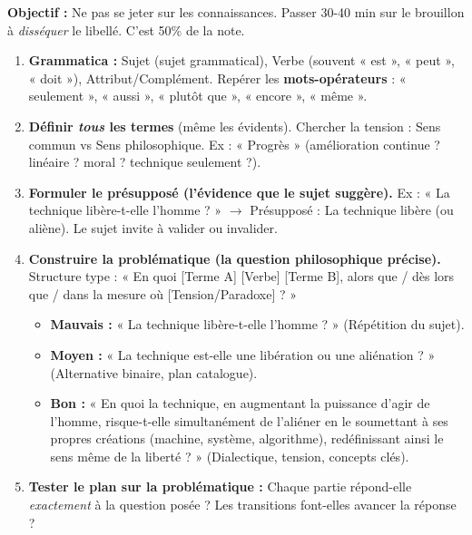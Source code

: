 \documentclass[11pt]{article}
\newcommand{\cle}[1]{{\popxbold\color{popdark}#1}}
\begin{document}
\begin{methode}
    \textbf{Objectif :} Ne pas se jeter sur les connaissances. Passer 30-40 min sur le brouillon à \emph{disséquer} le libellé. C'est 50\% de la note.
    \begin{enumerate}
        \item \textbf{Grammatica :} Sujet (sujet grammatical), Verbe (souvent « est », « peut », « doit »), Attribut/Complément. Repérer les \textbf{mots-opérateurs} : « seulement », « aussi », « plutôt que », « encore », « même ».
        \item \textbf{Définir \emph{tous} les termes} (même les évidents). Chercher la tension : Sens commun vs Sens philosophique. Ex : « Progrès » (amélioration continue ? linéaire ? moral ? technique seulement ?).
        \item \textbf{Formuler le \cle{présupposé} (l'évidence que le sujet suggère).} Ex : « La technique libère-t-elle l'homme ? » $\rightarrow$ Présupposé : La technique libère (ou aliène). Le sujet invite à valider ou invalider.
        \item \textbf{Construire la \cle{problématique} (la question philosophique précise).} Structure type : « En quoi [Terme A] [Verbe] [Terme B], alors que / dès lors que / dans la mesure où [Tension/Paradoxe] ? »
        \begin{itemize}
            \item \textbf{Mauvais :} « La technique libère-t-elle l'homme ? » (Répétition du sujet).
            \item \textbf{Moyen :} « La technique est-elle une libération ou une aliénation ? » (Alternative binaire, plan catalogue).
            \item \textbf{Bon :} « En quoi la technique, en augmentant la puissance d'agir de l'homme, risque-t-elle simultanément de l'aliéner en le soumettant à ses propres créations (machine, système, algorithme), redéfinissant ainsi le sens même de la liberté ? » (Dialectique, tension, concepts clés).
        \end{itemize}
        \item \textbf{Tester le plan sur la problématique :} Chaque partie répond-elle \emph{exactement} à la question posée ? Les transitions font-elles avancer la réponse ?
    \end{enumerate}
\end{methode}
\end{document}
